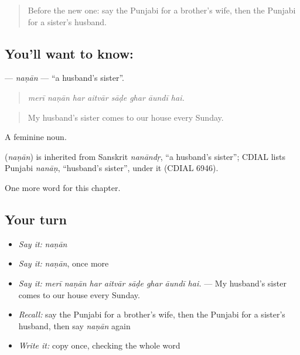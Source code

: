 \label{lesson:PA-C330-nanan}



\begin{quote}
Before the new one: say the Punjabi for a brother's wife, then the Punjabi for a sister's husband.
\end{quote}

\subsection*{You'll want to know: }
\textbf{} — \emph{naṇān} — \textquotedblleft{}a husband's sister\textquotedblright{}.

\begin{quote}
       
\end{quote}

\begin{quote}
\emph{merī naṇān har aitvār sāḍe ghar āundī hai.}
\end{quote}

\begin{quote}
My husband's sister comes to our house every Sunday.
\end{quote}

A feminine noun.

\begin{cousinweb}
\textbf{} (\emph{naṇān}) is inherited from Sanskrit \emph{nanāndṛ}, \textquotedblleft{}a husband's sister\textquotedblright{}; CDIAL lists Punjabi \emph{nanāṇ}, \textquotedblleft{}husband's sister\textquotedblright{}, under it (CDIAL 6946).
\end{cousinweb}

\begin{grammarlens}[title={What you've built}]
One more word for this chapter.
\end{grammarlens}

\subsection*{Your turn}
\begin{itemize}
\raggedright
  \item \emph{Say it:} \emph{naṇān}
  \item \emph{Say it:} \emph{naṇān}, once more
  \item \emph{Say it:} \emph{merī naṇān har aitvār sāḍe ghar āundī hai.} — My husband's sister comes to our house every Sunday.
  \item \emph{Recall:} say the Punjabi for a brother's wife, then the Punjabi for a sister's husband, then say \emph{naṇān} again
  \item \emph{Write it:} copy \textbf{} once, checking the whole word
\end{itemize}

